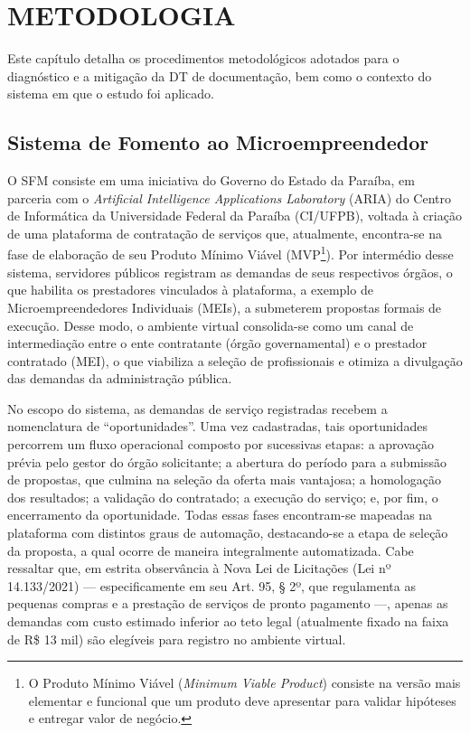 \section{METODOLOGIA}

Este capítulo detalha os procedimentos metodológicos adotados para o diagnóstico e a mitigação da DT de documentação, bem como o contexto do sistema em que o estudo foi aplicado.

\subsection{Sistema de Fomento ao Microempreendedor}
\label{sec:sfm}

O SFM consiste em uma iniciativa do Governo do Estado da Paraíba, em parceria com o \textit{Artificial Intelligence Applications Laboratory} (ARIA) do Centro de Informática da Universidade Federal da Paraíba (CI/UFPB), voltada à criação de uma plataforma de contratação de serviços que, atualmente, encontra-se na fase de elaboração de seu Produto Mínimo Viável (MVP\footnote{O Produto Mínimo Viável (\textit{Minimum Viable Product}) consiste na versão mais elementar e funcional que um produto deve apresentar para validar hipóteses e entregar valor de negócio.}). Por intermédio desse sistema, servidores públicos registram as demandas de seus respectivos órgãos, o que habilita os prestadores vinculados à plataforma, a exemplo de Microempreendedores Individuais (MEIs), a submeterem propostas formais de execução. Desse modo, o ambiente virtual consolida-se como um canal de intermediação entre o ente contratante (órgão governamental) e o prestador contratado (MEI), o que viabiliza a seleção de profissionais e otimiza a divulgação das demandas da administração pública.

No escopo do sistema, as demandas de serviço registradas recebem a nomenclatura de ``oportunidades''. Uma vez cadastradas, tais oportunidades percorrem um fluxo operacional composto por sucessivas etapas: a aprovação prévia pelo gestor do órgão solicitante; a abertura do período para a submissão de propostas, que culmina na seleção da oferta mais vantajosa; a homologação dos resultados; a validação do contratado; a execução do serviço; e, por fim, o encerramento da oportunidade. Todas essas fases encontram-se mapeadas na plataforma com distintos graus de automação, destacando-se a etapa de seleção da proposta, a qual ocorre de maneira integralmente automatizada. Cabe ressaltar que, em estrita observância à Nova Lei de Licitações (Lei nº 14.133/2021) --- especificamente em seu Art. 95, § 2º, que regulamenta as pequenas compras e a prestação de serviços de pronto pagamento ---, apenas as demandas com custo estimado inferior ao teto legal (atualmente fixado na faixa de R\$ 13 mil) são elegíveis para registro no ambiente virtual.

